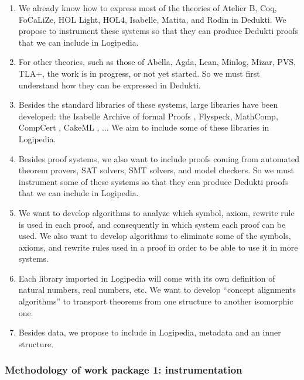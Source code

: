 \begin{enumerate}
\item We already know how to express most of the theories of {\sf Atelier B},
{\sf Coq}, {\sf FoCaLiZe}, {\sf HOL Light}, {\sf HOL4}, {\sf
Isabelle}, {\sf Matita}, and {\sf Rodin} in {\sf Dedukti}. We propose
to instrument these systems so that they can produce {\sf Dedukti}
proofs that we can include in {\sf Logipedia}.

\item
For other theories, such as those of {\sf Abella}, {\sf Agda}, {\sf
Lean}, {\sf Minlog}, {\sf Mizar}, {\sf PVS}, {\sf TLA+}, the work is
in progress, or not yet started.  So we must first understand how they
can be expressed in {\sf Dedukti}.

\item Besides the standard libraries of these systems, large libraries
  have been developed: the {\sf Isabelle Archive of formal Proofs} \cite{AFP},
  {\sf Flyspeck}\cite{Flyspeck}, {\sf MathComp}\cite{Mathcomp}, 
  {\sf CompCert} \cite{Compcert}, {\sf CakeML} \cite{CakeML}, ...  We aim to include
  some of these libraries in {\sf Logipedia}.
  
\item
Besides proof systems, we also want to include proofs coming from
automated theorem provers, SAT solvers, SMT solvers, and model
checkers.  So we must instrument some of these systems so that they
can produce {\sf Dedukti} proofs that we can include in {\sf
Logipedia}.

\item
We want to develop algorithms to analyze which symbol, axiom, rewrite
rule is used in each proof, and consequently in which system each proof
can be used. We also want to develop algorithms to eliminate some of the 
symbols, axioms, and rewrite rules used in a proof in order to be able to 
use it in more systems.


\item
Each library imported in {\sf Logipedia} will come with its own
definition of natural numbers, real numbers, etc. We want to develop
``concept alignments algorithms'' to transport theorems from one
structure to another isomorphic one.

\item 
Besides data, we propose to include in {\sf Logipedia}, metadata and
an inner structure.
\end{enumerate}

\subsubsection{Methodology of work package 1: instrumentation}


